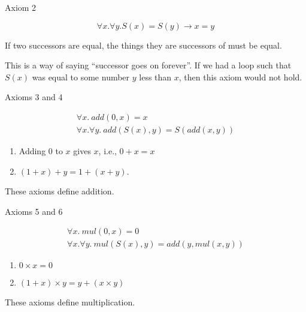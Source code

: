 \documentclass[xetex,aspectratio=169,14pt,hyperref={pdfpagelabels=true,pdflang={en-GB}}]{beamer}
\begin{document}
\begin{frame}
  {Axiom 2}

  \begin{displaymath}
    \forall x. \forall y. S(x) = S(y) \to x = y
  \end{displaymath}

  \bigskip

  If two successors are equal, the things they are successors of must
  be equal.

  \bigskip

  This is a way of saying ``successor goes on forever''. If we had a
  loop such that $S(x)$ was equal to some number $y$ less than $x$,
  then this axiom would not hold.
\end{frame}

\begin{frame}
  {Axioms 3 and 4}

  \begin{displaymath}
    \begin{array}{l}
      \forall x.~add(0,x) = x \\
      \forall x. \forall y.~add(S(x),y) = S(add(x,y))
    \end{array}
  \end{displaymath}

  \bigskip

  \begin{enumerate}
  \item Adding $0$ to $x$ gives $x$, i.e., $0+x=x$
  \item $(1+x)+y = 1+(x+y)$.
  \end{enumerate}

  \bigskip

  These axioms define addition.
\end{frame}

\begin{frame}
  {Axioms 5 and 6}

  \begin{displaymath}
    \begin{array}{l}
      \forall x.~mul(0,x) = 0 \\
      \forall x. \forall y.~mul(S(x),y) = add(y,mul(x,y))
    \end{array}
  \end{displaymath}

  \bigskip

  \begin{enumerate}
  \item $0 \times x = 0$
  \item $(1+x) \times y = y + (x \times y)$
  \end{enumerate}

  \bigskip

  These axioms define multiplication.
\end{frame}
\end{document}
